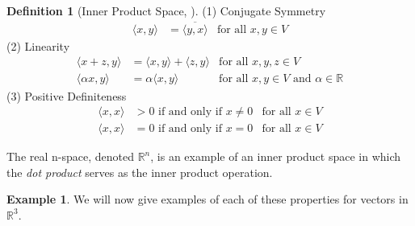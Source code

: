 \documentclass[11pt,reqno]{amsart}
\newcommand{\R}{\mathbb{R}}
\theoremstyle{plain}
\theoremstyle{definition}
\newtheorem{example}[theorem]{Example}
\newtheorem{definition}[theorem]{Definition}
\begin{document}
{\begin{definition}[{Inner Product Space, \cite{nimark}}]
    (1) Conjugate Symmetry
    \begin{align*}
        \langle x,y\rangle &= \overline{\langle y,x\rangle} &\text{for all $x,y\in V$}
    \end{align*}
    (2) Linearity
    \begin{align*}
        \langle x+z,y\rangle &= \langle x,y\rangle + \langle z,y\rangle & \text{for all $x,y,z\in V$}\\
         \langle \alpha x,y\rangle &= \alpha\langle x,y\rangle &\text{for all $x,y\in V$ and $\alpha\in\R$}
    \end{align*}
    (3) Positive Definiteness
    \begin{align*}
        \langle x,x\rangle &> 0 \text{ if and only if } x\neq 0 &\text{for all $x\in V$}\\
        \langle x,x\rangle &= 0 \text{ if and only if } x=0 &\text{for all $x\in V$}
    \end{align*}

    The real n-space, denoted $\R^n$, is an example of an inner product space in which the \emph{dot product} serves as the inner product operation.
\end{definition}
\smallskip
\begin{example}
    We will now give examples of each of these properties for vectors in $\R^3$.


\end{example}}
\end{document}
